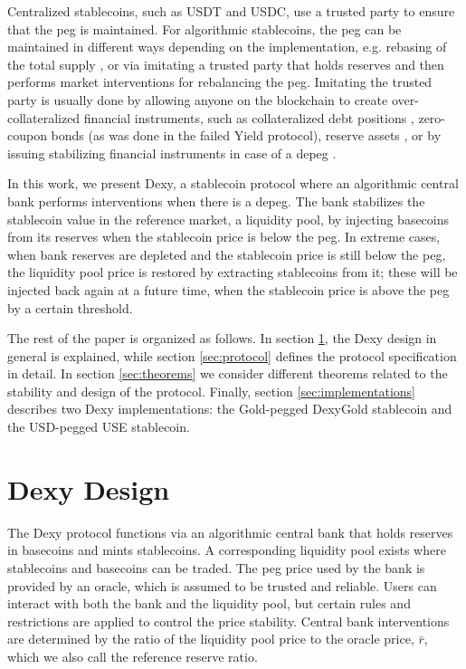 \documentclass{ifcolog}
\newcommand{\rr}{\bar{r}}
\newcommand{\dx}{Dexy}
\begin{document}
Centralized stablecoins, such as USDT and USDC, use a trusted party to ensure that the peg is maintained. For algorithmic stablecoins, 
the peg can be maintained in different ways depending on the implementation, e.g. rebasing of the total supply \cite{Ampleforth}, 
or via imitating a trusted party that holds reserves and then performs market interventions for rebalancing the peg. 
Imitating the trusted party is usually done by allowing anyone on the blockchain to create over-collateralized financial instruments, 
such as collateralized debt positions \cite{DAI}, zero-coupon bonds (as was done in the failed Yield protocol), 
reserve assets \cite{DjedEprint,Gluon}, or by issuing stabilizing financial instruments in case of a depeg \cite{Neutrino}.

In this work, we present \dx{}, a stablecoin protocol where an algorithmic central bank performs interventions when there is a depeg.
The bank stabilizes the stablecoin value in the reference market, a liquidity pool, by injecting basecoins from its reserves when the 
stablecoin price is below the peg. In extreme cases, when bank reserves are depleted and the stablecoin price is still below the peg, 
the liquidity pool price is restored by extracting stablecoins from it; these will be injected back again at a future time, 
when the stablecoin price is above the peg by a certain threshold. 

The rest of the paper is organized as follows. In section \ref{sec:design}, the \dx{} design in general is explained, while 
section \ref{sec:protocol} defines the protocol specification in detail.
In section \ref{sec:theorems} we consider different theorems related to the stability and design of the protocol.
Finally, section \ref{sec:implementations} describes two \dx{} implementations: the Gold-pegged DexyGold stablecoin and the USD-pegged USE stablecoin.

\section{\dx{} Design}
\label{sec:design}

The \dx{} protocol functions via an algorithmic central bank that holds reserves in basecoins and mints stablecoins. 
A corresponding liquidity pool exists where stablecoins and basecoins can be traded. 
The peg price used by the bank is provided by an oracle, which is assumed to be trusted and reliable. 
Users can interact with both the bank and the liquidity pool, but certain rules and restrictions are applied to control 
the price stability. Central bank interventions are determined by the ratio of the liquidity pool price to the oracle price, $\rr$, 
which we also call the reference reserve ratio. 
\end{document}
